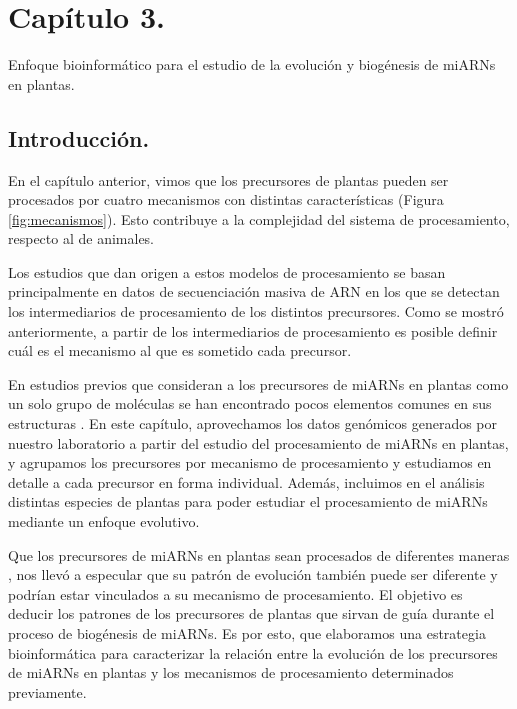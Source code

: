 
\graphicspath{{Chapter3/Figs/}}

\setcounter{chapter}{6}
\chapter*{Capítulo 3.} 
\setcounter{figure}{0}
\setcounter{table}{0}
\setcounter{section}{0}

{\LARGE Enfoque bioinformático para el estudio de la evolución y biogénesis de miARNs en plantas.}


\section{Introducción.}

En el capítulo anterior, vimos que los precursores de plantas pueden ser procesados por cuatro mecanismos con distintas características (Figura \ref{fig:mecanismos}).
Esto contribuye a la complejidad del sistema de procesamiento, respecto al de animales.

Los estudios que dan origen a estos modelos de procesamiento se basan principalmente en datos de secuenciación masiva de ARN en los que se detectan los intermediarios de procesamiento de los distintos precursores.
Como se mostró anteriormente, a partir de los intermediarios de procesamiento es posible definir cuál es el mecanismo al que es sometido cada precursor.

En estudios previos que consideran a los precursores de miARNs en plantas como un solo grupo de moléculas se han encontrado pocos elementos comunes en sus estructuras \citep{Mateos2010}.
En este capítulo, aprovechamos los datos genómicos generados por nuestro laboratorio a partir del estudio del procesamiento de miARNs en plantas, y agrupamos los precursores por mecanismo de procesamiento y estudiamos en detalle a cada precursor en forma individual.
Además, incluimos en el análisis distintas especies de plantas para poder estudiar el procesamiento de miARNs mediante un enfoque evolutivo.

Que los precursores de miARNs en plantas sean procesados de diferentes maneras \citep{Bologna2013}, nos llevó a especular que su patrón de evolución también puede ser diferente y podrían estar vinculados a su mecanismo de procesamiento.
El objetivo es deducir los patrones de los precursores de plantas que sirvan de guía durante el proceso de biogénesis de miARNs.
Es por esto, que elaboramos una estrategia bioinformática para caracterizar la relación entre la evolución de los precursores de miARNs en plantas y los mecanismos de procesamiento determinados previamente.

